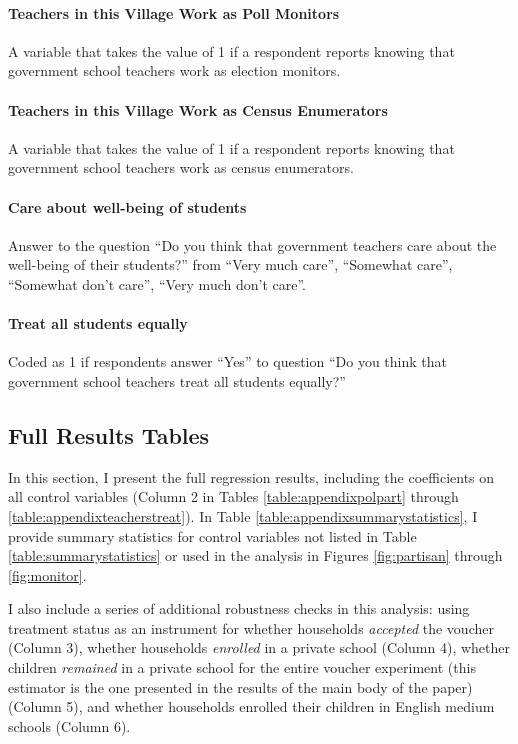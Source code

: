 \documentclass[hidelinks, 12pt, titlepage]{article}
\begin{document}
			\paragraph{Teachers in this Village Work as Poll Monitors} A variable that takes the value of 1 if a respondent reports knowing that government school teachers work as election monitors.

			\paragraph{Teachers in this Village Work as Census Enumerators} A variable that takes the value of 1 if a respondent reports knowing that government school teachers work as census enumerators.

			\paragraph{Care about well-being of students} Answer to the question ``Do you think that government teachers care about the well-being of their students?'' from ``Very much care'', ``Somewhat care'', ``Somewhat don't care'', ``Very much don't care''.

			\paragraph{Treat all students equally} Coded as 1 if respondents answer ``Yes'' to question ``Do you think that government school teachers treat all students equally?''

		\clearpage

		\subsection{Full Results Tables\label{appendix:fullresults}}

			In this section, I present the full regression results, including the coefficients on all control variables (Column 2 in Tables \ref{table:appendixpolpart} through \ref{table:appendixteacherstreat}).  In Table \ref{table:appendixsummarystatistics}, I provide summary statistics for control variables not listed in Table \ref{table:summarystatistics} or used in the analysis in Figures \ref{fig:partisan} through \ref{fig:monitor}.

			

			I also include a series of additional robustness checks in this analysis: using treatment status as an instrument for whether households \emph{accepted} the voucher (Column 3), whether households \emph{enrolled} in a private school (Column 4), whether children \emph{remained} in a private school for the entire voucher experiment (this estimator is the one presented in the results of the main body of the paper) (Column 5), and whether households enrolled their children in English medium schools (Column 6).
\end{document}
